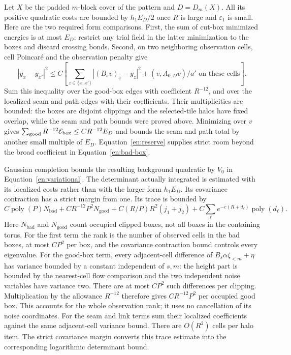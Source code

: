 Let $X$ be the padded $m$-block cover of the pattern and $D=D_m(X)$.
All its positive quadratic costs are bounded by $h_1E_D/2$ once
$R$ is large and $\varepsilon_1$ is small.  Here are the two required
form comparisons.  First, the sum of cut-box minimized energies is
at most $E_D$: restrict any trial field in the latter minimization to
the boxes and discard crossing bonds.  Second, on two neighboring
observation cells, cell Poincar\'e and the observation penalty give
\[
 |y_x-y_{x'}|^2\leq C\left[
  \sum_{z\in\{x,x'\}}|(B_sv)_z-y_z|^2
             +(v,A_{0,D}v)/a'\text{ on these cells}\right].
\]
Sum this inequality over the good-box edges with coefficient
$R^{-12}$, and over the localized seam and path edges with their
coefficients.  Their multiplicities are bounded: the boxes are disjoint
clippings and the selected-tile halos have fixed overlap, while the
seam and path bounds were proved above.  Minimizing over $v$ gives
$\sum_{\rm good}R^{-12}\mathcal E_{\rm box}\le CR^{-12}E_D$
and bounds the seam and path total by another small multiple of $E_D$.
Equation~\eqref{en:reserve} supplies strict room beyond the broad
coefficient in Equation~\eqref{en:bad-box}.

Gaussian completion bounds the resulting background quadratic by
$V_0$ in Equation~\eqref{en:variational}.  The determinant actually
integrated is estimated with its localized costs rather than with
the larger form $h_1E_D$.  Its covariance contraction has a strict
margin from one.  Its trace is bounded by
\begin{equation}\label{en:trace-entry}
 C\operatorname{poly}(P)N_{\mathrm{bad}}
 +CR^{-12}P^2N_{\mathrm{good}}
 +C(R/P)R^2(j_1+j_2)
 +C\sum_\ell e^{-c(R+d_\ell)}\operatorname{poly}(d_\ell).
\end{equation}
Here $N_{\mathrm{bad}}$ and $N_{\mathrm{good}}$ count occupied
clipped boxes, not all boxes in the containing torus.  For the first
term the rank is the number of observed cells in the bad boxes, at
most $CP^2$ per box, and the covariance contraction bound controls
every eigenvalue.  For the good-box term, every adjacent-cell
difference of $B_s\alpha\zeta_{<m}+\eta$ has variance bounded by a
constant independent of $s,m$: the height part is bounded by the
nearest-cell flow comparison and the two independent noise variables
have variance two.  There are at most $CP^2$ such differences per
clipping.  Multiplication by the allowance $R^{-12}$ therefore gives
$CR^{-12}P^2$ per occupied good box.  This accounts for the whole
observation rank; it uses no cancellation of its noise coordinates.
For the seam and link terms sum their localized coefficients against
the same adjacent-cell variance bound.  There are $O(R^2)$ cells per
halo item.  The strict covariance margin converts this trace estimate
into the corresponding logarithmic determinant bound.

